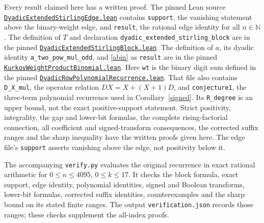 \documentclass[11pt]{article}
\begin{document}
\begingroup\raggedright
Every result claimed here has a written proof. The pinned Lean source
\href{https://github.com/the-omega-institute/trureturing/blob/47f05ad67b37a0f7cbc4673c33bb17fb7c1e78fb/D5/S1/Recurrence/Parity/DyadicExtendedStirlingEdge.lean}{\texttt{DyadicExtendedStirlingEdge.lean}}
contains \texttt{support}, the vanishing statement above the binary-weight
edge, and \texttt{result}, the rational edge identity for all $n\in\mathbb N$.
The definition of $T$ and declaration \texttt{dyadic\_extended\_stirling\_block}
are in the pinned
\href{https://github.com/the-omega-institute/trureturing/blob/47f05ad67b37a0f7cbc4673c33bb17fb7c1e78fb/D5/S1/Recurrence/Parity/DyadicExtendedStirlingBlock.lean}{\texttt{DyadicExtendedStirlingBlock.lean}}.
The definition of $a$, its dyadic identity \texttt{a\_two\_pow\_mul\_odd},
and \eqref{abin} as \texttt{result} are in the pinned
\href{https://github.com/the-omega-institute/trureturing/blob/47f05ad67b37a0f7cbc4673c33bb17fb7c1e78fb/D5/S1/Digit/KurkovWeightProductBinomial.lean}{\texttt{KurkovWeightProductBinomial.lean}}.
Here \texttt{wt} is the binary digit sum defined in the pinned
\href{https://github.com/the-omega-institute/trureturing/blob/47f05ad67b37a0f7cbc4673c33bb17fb7c1e78fb/D5/S1/Digit/DyadicRowPolynomialRecurrence.lean}{\texttt{DyadicRowPolynomialRecurrence.lean}}.
That file also contains \texttt{D\_X\_mul}, the operator relation
$DX=X+(X+1)D$, and \texttt{conjecture1}, the three-term polynomial
recurrence used in Corollary~\ref{signed}. Its \texttt{R\_degree}
is an upper bound, not the exact positive-support statement.
Strict positivity, integrality, the gap and lower-bit formulas, the complete
rising-factorial connection, all coefficient and signed-transform
consequences, the corrected suffix ranges and the sharp inequality have
the written proofs given here. The edge file's \texttt{support} asserts
vanishing above the edge, not positivity below it.\par
\endgroup

\begin{samepage}
The accompanying \texttt{verify.py} evaluates the original recurrence in
exact rational arithmetic for $0\leq n\leq4095$, $0\leq k\leq17$.
It checks the block formula, exact support, edge identity, polynomial
identities, signed and Boolean transforms, lower-bit formulas, corrected
suffix identities, counterexamples and the sharp bound on its stated
finite ranges. The output \texttt{verification.json} records those ranges;
these checks supplement the all-index proofs.\par
\end{samepage}
\end{document}
